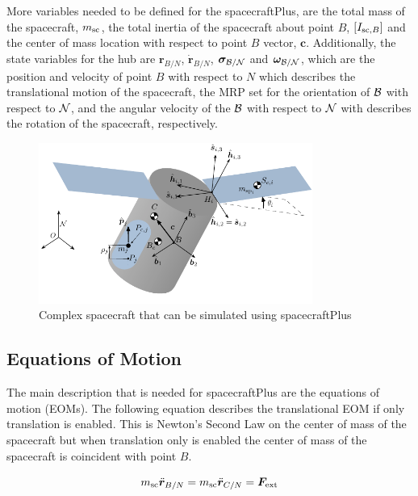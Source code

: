 More variables needed to be defined for the spacecraftPlus, are the total mass of the spacecraft, $m_{\textnormal{sc}}$, the total inertia of the spacecraft about point $B$,  $[I_{\textnormal{sc},B}]$ and the center of mass location with respect to point $B$ vector, $\bm c$. Additionally, the state variables for the hub are $\bm r_{B/N}$, $\dot{\bm r}_{B/N}$, $\bm \sigma_{\cal{B}/\cal{N}}$ and $\bm \omega_{\cal{B}/\cal{N}}$, which are the position and velocity of point $B$ with respect to $N$ which describes the translational motion of the spacecraft, the MRP set for the orientation of $\cal{B}$ with respect to $\cal{N}$, and the angular velocity of the $\cal{B}$ with respect to $\cal{N}$ with describes the rotation of the spacecraft, respectively. 


\begin{figure}[htbp]
	\centerline{
		\includegraphics[width=0.8\textwidth]{Figures/Flex_Slosh_Figure}}
	\caption{Complex spacecraft that can be simulated using spacecraftPlus}
	\label{fig:FlexSloshFigure}
\end{figure}

\subsection{Equations of Motion}

The main description that is needed for spacecraftPlus are the equations of motion (EOMs). The following equation describes the translational EOM if only translation is enabled. This is Newton's Second Law on the center of mass of the spacecraft but when translation only is enabled the center of mass of the spacecraft is coincident with point $B$. 

\begin{equation}
m_{\text{sc}} \ddot{\bm r}_{B/N} = m_{\text{sc}} \ddot{\bm r}_{C/N} =  \bm F_{\textnormal{ext}}
\label{eq:Rbddot3}
\end{equation}

